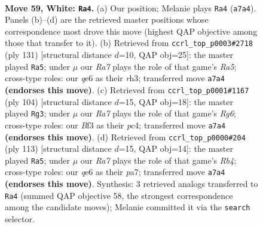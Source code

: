 \documentclass[11pt]{article}
\begin{document}
\clearpage

\begin{figure}[p]\centering
\begin{subfigure}{0.46\textwidth}\centering
\resizebox{\linewidth}{!}{%
\newchessgame
\chessboard[
  setfen={8/R7/4q3/2k5/1p6/b4BK1/8/8 w - - 8 59},
  showmover=false,
  pgfstyle=straightmove, color=movearrow, markmove={a7-a4}
]}
\caption{}
\end{subfigure}\hfill
\begin{subfigure}{0.46\textwidth}\centering
\resizebox{\linewidth}{!}{%
\newchessgame
\chessboard[
  setfen={8/4kb2/8/8/r3B3/4KP1R/8/8 b - - 6 66},
  showmover=false,
  pgfstyle=straightmove, color=movearrow, markmove={a4-a5}
]}
\caption{}
\end{subfigure}
\\[4pt]
\begin{subfigure}{0.46\textwidth}\centering
\resizebox{\linewidth}{!}{%
\newchessgame
\chessboard[
  setfen={8/p7/1b4R1/8/2p5/8/k3K3/8 w - - 0 53},
  showmover=false,
  pgfstyle=straightmove, color=movearrow, markmove={g6-g3}
]}
\caption{}
\end{subfigure}\hfill
\begin{subfigure}{0.46\textwidth}\centering
\resizebox{\linewidth}{!}{%
\newchessgame
\chessboard[
  setfen={8/P7/3k4/1r6/8/1BK5/2P5/8 b - - 0 57},
  showmover=false,
  pgfstyle=straightmove, color=movearrow, markmove={b5-a5}
]}
\caption{}
\end{subfigure}
\caption{\textbf{Move 59, White: \texttt{Ra4}.} (a) Our position; Melanie plays \texttt{Ra4} (\texttt{a7a4}). Panels (b)--(d) are the retrieved master positions whose correspondence most drove this move (highest QAP objective among those that transfer to it). (b) Retrieved from \texttt{ccrl\_top\_p0003\#2718} (ply 131) [structural distance $d$=10, QAP obj=25]: the master played \texttt{Ra5}; under $\mu$ our \emph{Ra7} plays the role of that game's \emph{Ra5}; cross-type roles: our \emph{q}e6 as their \emph{r}h3; transferred move \texttt{a7a4} \textbf{(endorses this move)}. (c) Retrieved from \texttt{ccrl\_top\_p0001\#1167} (ply 104) [structural distance $d$=15, QAP obj=18]: the master played \texttt{Rg3}; under $\mu$ our \emph{Ra7} plays the role of that game's \emph{Rg6}; cross-type roles: our \emph{B}f3 as their \emph{p}c4; transferred move \texttt{a7a4} \textbf{(endorses this move)}. (d) Retrieved from \texttt{ccrl\_top\_p0000\#204} (ply 113) [structural distance $d$=15, QAP obj=14]: the master played \texttt{Ra5}; under $\mu$ our \emph{Ra7} plays the role of that game's \emph{Rb4}; cross-type roles: our \emph{q}e6 as their \emph{p}a7; transferred move \texttt{a7a4} \textbf{(endorses this move)}. Synthesis: 3 retrieved analogs transferred to \texttt{Ra4} (summed QAP objective 58, the strongest correspondence among the candidate moves); Melanie committed it via the \texttt{search} selector.}
\label{fig:thought-m116}
\end{figure}
\end{document}
